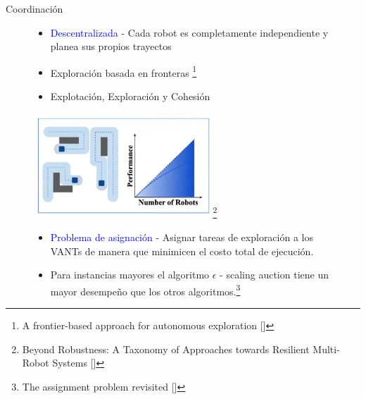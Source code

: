 \documentclass[
  24pt, %
  aspectratio=169, %
]{beamer}
\begin{document}
\begin{frame}{Coordinación}
  \begin{figure}[ht!]
    \centering
    \begin{minipage}{0.48\textwidth}
      {\scriptsize
      \begin{itemize}
      \item \textcolor{blue}{Descentralizada} - Cada robot es completamente independiente y planea sus propios trayectos
      \item Exploración basada en fronteras {\footnote{\tiny{A frontier-based approach for autonomous exploration [\cite{613851}]}}}
      \item Explotación, Exploración y Cohesión
      \end{itemize}
      }
    \end{minipage}\hfill
    \begin{minipage}{0.48\textwidth}
      \centering
      \includegraphics[width=0.6\textwidth]{coordination}{\footnote{\tiny{Beyond Robustness: A Taxonomy of Approaches towards Resilient Multi-Robot Systems [\cite{amanda}]}}}
    \end{minipage}
    \vspace{-0.2cm} %
    \begin{minipage}{0.48\textwidth}
      {\scriptsize
      \begin{itemize}
      \item \textcolor{blue}{Problema de asignación} - Asignar tareas de exploración a los VANTs de manera que minimicen el costo total de ejecución.
      \item Para instancias mayores el algoritmo $\epsilon$ - scaling auction tiene un mayor desempeño que los otros algoritmos.{\footnote{\tiny{The assignment problem revisited [\cite{Alfaro2021}]}}}
      \end{itemize}
      }
    \end{minipage}\hfill
    \begin{minipage}{0.48\textwidth}

\end{minipage}
\end{figure}
\end{frame}
\end{document}
